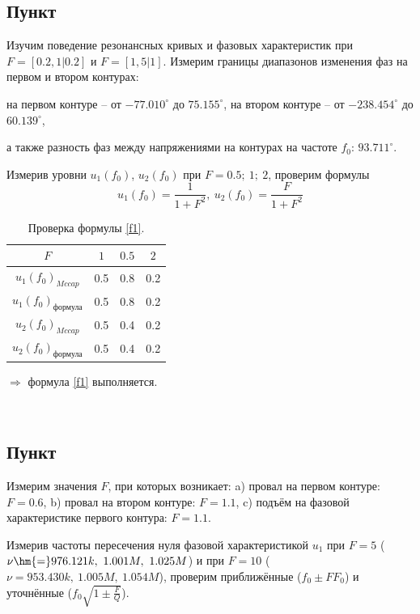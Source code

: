 \documentclass[a4paper, 14pt]{extarticle}%
\begin{document}
\subsection{Пункт}
Изучим поведение резонансных кривых и фазовых характеристик при $F = [0.2, 1|0.2]$ и $F = [1, 5|1]$. Измерим границы диапазонов изменения фаз на первом и втором контурах: 

на первом контуре -- от $-77.010^{\circ}$ до $75.155^{\circ}$, на втором контуре -- от $-238.454^{\circ}$ до $60.139^{\circ}$,

а также разность фаз между напряжениями на контурах на частоте $f_0$: $93.711^{\circ}$.

Измерив уровни $u_1(f_0)$, $u_2(f_0)$ при $F = 0.5;~1;~2$, проверим формулы 
\begin{equation}
\label{f1}
u_1(f_0) = \frac{1}{1+F^2},~u_2(f_0)= \frac{F}{1+F^2}
\end{equation}

\begin{table}[H]
	\centering
	\caption{Проверка формулы \eqref{f1}.}
	\begin{tabular}{c|ccc} \toprule
		$F$                         & $1$ & $0.5$ & $2$ \\ \midrule
		$u_1(f_0)_{Mccap}$          & 0.5 & 0.8   & 0.2 \\
		$u_1(f_0)_{\text{формула}}$ & 0.5 & 0.8   & 0.2 \\
		$u_2(f_0)_{Mccap}$          & 0.5 & 0.4   & 0.2 \\
		$u_2(f_0)_{\text{формула}}$ & 0.5 & 0.4   & 0.2 \\ \bottomrule
	\end{tabular}
\end{table}

$\Longrightarrow$ формула \eqref{f1} выполняется.

~

\subsection{Пункт}

Измерим значения $F$, при которых возникает: a) провал на первом контуре: $F = 0.6$, b) провал на втором контуре: $F = 1.1$, c) подъём на фазовой характеристике первого контура: $F = 1.1$.

Измерив частоты пересечения нуля фазовой характеристикой $u_1$ при $F = 5$ ($\nu \hm{=} 976.121k,~1.001M,~1.025M$) и при $F = 10$ ( $\nu = 953.430k,~1.005M,~1.054M$), проверим приближённые ($f_0\pm FF_0$) и уточнённые ($f_0\sqrt{1\pm\frac{F}{Q}}$).
\end{document}
